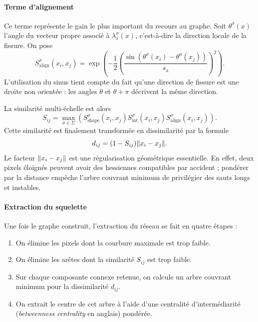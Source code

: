 \paragraph{Terme d'alignement}
Ce terme représente le gain le plus important du recours au graphe. Soit $\theta^\sigma(x)$ l'angle du vecteur propre associé à $\lambda_1^\sigma(x)$, c'est-à-dire la direction locale de la fissure. On pose
\begin{equation}
    S_{\mathrm{align}}^\sigma(x_i,x_j)
    =
    \exp\left(
        -\frac12
        \left(
            \frac{\sin(\theta^\sigma(x_i)-\theta^\sigma(x_j))}{s_{\mathrm{a}}}
        \right)^2
    \right).
    \label{eq:chapIII_align}
\end{equation}
L'utilisation du sinus tient compte du fait qu'une direction de fissure est une droite non orientée : les angles $\theta$ et $\theta+\pi$ décrivent la même direction.

La similarité multi-échelle est alors
\begin{equation}
    S_{ij}
    =
    \max_{\sigma\in\Sigma}
    \left(
        S_{\mathrm{shape}}^\sigma(x_i,x_j)
        S_{\mathrm{int}}^\sigma(x_i,x_j)
        S_{\mathrm{align}}^\sigma(x_i,x_j)
    \right).
    \label{eq:chapIII_similarity}
\end{equation}
Cette similarité est finalement transformée en dissimilarité par la formule
\begin{equation}
    d_{ij}
    =
    (1-S_{ij})\lVert x_i-x_j \rVert.
    \label{eq:chapIII_distance}
\end{equation}
Le facteur $\lVert x_i-x_j \rVert$ est une régularisation géométrique essentielle. En effet, deux pixels éloignés peuvent avoir des hessiennes compatibles par accident ; pondérer par la distance empêche l'arbre couvrant minimum de privilégier des sauts longs et instables. 

\paragraph{Extraction du squelette}
Une fois le graphe construit, l'extraction du réseau se fait en quatre étapes :
\begin{enumerate}
    \item On élimine les pixels dont la courbure maximale est trop faible.
    \item On élimine les arêtes dont la similarité $S_{ij}$ est trop faible.
    \item Sur chaque composante connexe retenue, on calcule un arbre couvrant minimum pour la dissimilarité $d_{ij}$.
    \item On extrait le centre de cet arbre à l'aide d'une centralité d'intermédiarité (\emph{betweenness centrality} en anglais) pondérée.
\end{enumerate}

